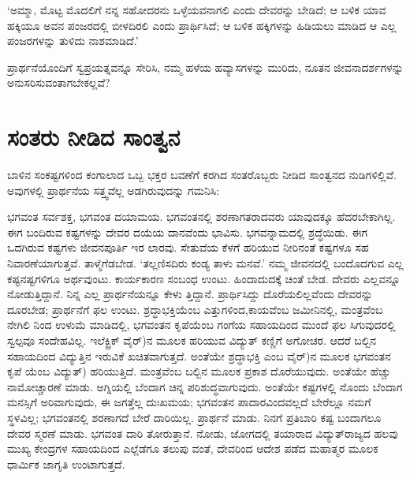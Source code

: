 ‘ಅಮ್ಮಾ, ಮೊಟ್ಟ ಮೊದಲಿಗೆ ನನ್ನ ಸಹೋದರನು ಒಳ್ಳೆಯವನಾಗಲಿ ಎಂದು ದೇವರನ್ನು ಬೇಡಿದೆ; ಆ ಬಳಿಕ ಯಾವ ಹಕ್ಕಿಯೂ ಅವನ ಪಂಜರದಲ್ಲಿ ಬೀಳದಿರಲಿ ಎಂದು ಪ್ರಾರ್ಥಿಸಿದೆ; ಆ ಬಳಿಕ ಹಕ್ಕಿಗಳನ್ನು ಹಿಡಿಯಲು ಮಾಡಿದ ಆ ಎಲ್ಲ ಪಂಜರಗಳನ್ನು ತುಳಿದು ನಾಶಮಾಡಿದೆ.’

ಪ್ರಾರ್ಥನೆಯೊಂದಿಗೆ ಸ್ವಪ್ರಯತ್ನವನ್ನೂ ಸೇರಿಸಿ, ನಮ್ಮ ಹಳೆಯ ಹವ್ಯಾಸಗಳನ್ನು ಮುರಿದು, ನೂತನ ಜೀವನಾದರ್ಶಗಳನ್ನು ಅನುಸರಿಸುವಂತಾಗಬೇಕಲ್ಲವೆ?


\section{ಸಂತರು ನೀಡಿದ ಸಾಂತ್ವನ}

ಬಾಳಿನ ಸಂಕಷ್ಟಗಳಿಂದ ಕಂಗಾಲಾದ ಒಬ್ಬ ಭಕ್ತರ ಬವಣೆಗೆ ಕರಗಿದ ಸಂತರೊಬ್ಬರು ನೀಡಿದ ಸಾಂತ್ವನದ ನುಡಿಗಳಿಲ್ಲಿವೆ. ಅವುಗಳಲ್ಲಿ ಪ್ರಾರ್ಥನೆಯ ಸತ್ತ್ವವೆಲ್ಲ ಅಡಗಿರುವುದನ್ನು ಗಮನಿಸಿ:

ಭಗವಂತ ಸರ್ವಶಕ್ತ, ಭಗವಂತ ದಯಾಮಯ. ಭಗವಂತನಲ್ಲಿ ಶರಣಾಗತರಾದವರು ಯಾವುದಕ್ಕೂ ಹೆದರಬೇಕಾಗಿಲ್ಲ. ಈಗ ಬಂದಿರುವ ಕಷ್ಟಗಳನ್ನು ದೇವರ ದಯೆಯ ದಾನವೆಂದು ಭಾವಿಸು. ಭಗವನ್ನಾಮದಲ್ಲಿ ಶ್ರದ್ಧೆಯಿಡು. ಈಗ ಒದಗಿರುವ ಕಷ್ಟಗಳು ಜೀವನಪೂರ್ತಿ ಇರ ಲಾರವು. ಸೇತುವೆಯ ಕೆಳಗೆ ಹರಿಯುವ ನೀರಿನಂತೆ ಕಷ್ಟಗಳೂ ಸಹ ನಿವಾರಣೆಯಾಗುತ್ತವೆ. ತಾಳ್ಮೆಗೆಡಬೇಡ. ‘ತಲ್ಲಣಿಸದಿರು ಕಂಡ್ಯ ತಾಳು ಮನವೆ.’ ನಮ್ಮ ಜೀವನದಲ್ಲಿ ಬಂದೊದಗುವ ಎಲ್ಲ ಕಷ್ಟನಷ್ಟಗಳಿಗೂ ಅರ್ಥವುಂಟು. ಕಾರ್ಯಕಾರಣ ಸಂಬಂಧ ಉಂಟು. ಹಿಂದಾದುದಕ್ಕೆ ಚಿಂತೆ ಬೇಡ. ದೇವರು ಎಲ್ಲವನ್ನೂ ನೋಡುತ್ತಿದ್ದಾನೆ. ನಿನ್ನ ಎಲ್ಲ ಪ್ರಾರ್ಥನೆಯನ್ನೂ ಕೇಳು ತ್ತಿದ್ದಾನೆ. ಪ್ರಾರ್ಥಿಸಿದ್ದು ದೊರೆಯಲಿಲ್ಲವೆಂದು ದೇವರನ್ನು ದೂರಬೇಡ; ಪ್ರಾರ್ಥನೆಗೆ ಫಲ ಉಂಟು. ಶ್ರದ್ಧಾಭಕ್ತಿಯೆಂಬ ಎತ್ತುಗಳಿಂದ,ಕಾಯವೆಂಬ ಜಮೀನಿನಲ್ಲಿ, ಮಂತ್ರವೆಂಬ ನೇಗಿಲಿ ನಿಂದ ಉಳುಮೆ ಮಾಡಿದಲ್ಲಿ, ಭಗವಂತನ ಕೃಪೆಯೆಂಬ ಗಂಗೆಯ ಸಹಾಯದಿಂದ ಮುಂದೆ ಫಲ ಸಿಗುವುದರಲ್ಲಿ ಸ್ವಲ್ಪವೂ ಸಂದೇಹವಿಲ್ಲ. ಇಲೆಕ್ಟ್ರಿಕ್ ವೈರ್​)ನ ಮೂಲಕ ಹರಿಯುವ ವಿದ್ಯುತ್ ಕಣ್ಣಿಗೆ ಅಗೋಚರ. ಆದರೆ ಬಲ್ಬಿನ ಸಹಾಯದಿಂದ ವಿದ್ಯುತ್ತಿನ ಇರುವಿಕೆ ಖಚಿತವಾಗುತ್ತದೆ. ಅಂತೆಯೇ ಶ್ರದ್ಧಾಭಕ್ತಿ ಎಂಬ ವೈರ್​)ನ ಮೂಲಕ ಭಗವಂತನ ಕೃಪೆ ಯೆಂಬ ವಿದ್ಯುತ್​) ಹರಿಯುತ್ತಿದೆ. ಮಂತ್ರವೆಂಬ ಬಲ್ಬಿನ ಮೂಲಕ ಪ್ರಕಾಶ ದೊರೆಯುವುದು. ಅಂತೆಯೇ ಹೆಚ್ಚು ನಾಮೋಚ್ಚಾರಣೆ ಮಾಡು. ಅಗ್ನಿಯಲ್ಲಿ ಬೆಂದಾಗ ಚಿನ್ನ ಪರಿಶುದ್ಧವಾಗುವುದು. ಅಂತೆಯೇ ಕಷ್ಟಗಳಲ್ಲಿ ನೊಂದು ಬೆಂದಾಗ ಮನಸ್ಸಿಗೆ ಅರಿವಾಗುವುದು, ಈ ಜಗತ್ತೆಲ್ಲ ದುಃಖಮಯ; ಭಗವಂತನ ಪಾದಾರವಿಂದವಲ್ಲದೆ ಬೇರೆಲ್ಲೂ ನಮಗೆ ಸ್ಥಳವಿಲ್ಲ; ಭಗವಂತನಲ್ಲಿ ಶರಣಾಗದೆ ಬೇರೆ ದಾರಿಯಿಲ್ಲ. ಪ್ರಾರ್ಥನೆ ಮಾಡು. ನಿನಗೆ ಪ್ರತಿಬಾರಿ ಕಷ್ಟ ಬಂದಾಗಲೂ ದೇವರ ಸ್ಮರಣೆ ಮಾಡು. ಭಗವಂತ ದಾರಿ ತೋರುತ್ತಾನೆ. ನೋಡು, ಜೋಗದಲ್ಲಿ ತಯಾರಾದ ವಿದ್ಯುತ್​ರಾಜ್ಯದ ಹಲವು ಮುಖ್ಯ ಕೇಂದ್ರಗಳ ಸಹಾಯದಿಂದ ಎಲ್ಲೆಡೆಗೂ ತಲುಪು ವಂತೆ, ದೇವರಿಂದ ಆದೇಶ ಪಡೆದ ಮಹಾತ್ಮರ ಮೂಲಕ ಧಾರ್ಮಿಕ ಜಾಗೃತಿ ಉಂಟಾಗುತ್ತದೆ.

